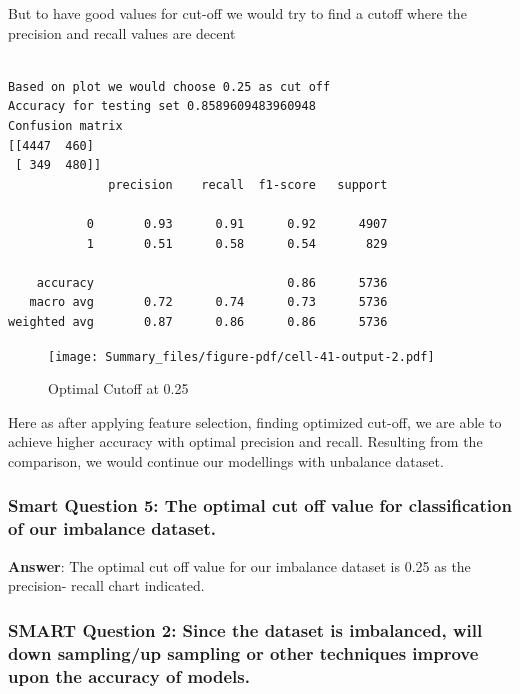 \documentclass[
  letterpaper,
  DIV=11,
  numbers=noendperiod]{scrartcl}
\begin{document}
But to have good values for cut-off we would try to find a cutoff where
the precision and recall values are decent

\begin{verbatim}

Based on plot we would choose 0.25 as cut off 
Accuracy for testing set 0.8589609483960948
Confusion matrix 
[[4447  460]
 [ 349  480]]
              precision    recall  f1-score   support

           0       0.93      0.91      0.92      4907
           1       0.51      0.58      0.54       829

    accuracy                           0.86      5736
   macro avg       0.72      0.74      0.73      5736
weighted avg       0.87      0.86      0.86      5736
\end{verbatim}

\begin{figure}

{\centering \texttt{[image: Summary\_files/figure-pdf/cell-41-output-2.pdf]}

}

\caption{Optimal Cutoff at 0.25}

\end{figure}

Here as after applying feature selection, finding optimized cut-off, we
are able to achieve higher accuracy with optimal precision and recall.
Resulting from the comparison, we would continue our modellings with
unbalance dataset.

\hypertarget{smart-question-5-the-optimal-cut-off-value-for-classification-of-our-imbalance-dataset.}{%
\subsubsection{Smart Question 5: The optimal cut off value for
classification of our imbalance
dataset.}\label{smart-question-5-the-optimal-cut-off-value-for-classification-of-our-imbalance-dataset.}}

\textbf{Answer}: The optimal cut off value for our imbalance dataset is
0.25 as the precision- recall chart indicated.

\hypertarget{smart-question-2-since-the-dataset-is-imbalanced-will-down-samplingup-sampling-or-other-techniques-improve-upon-the-accuracy-of-models.}{%
\subsubsection{SMART Question 2: Since the dataset is imbalanced, will
down sampling/up sampling or other techniques improve upon the accuracy
of
models.}\label{smart-question-2-since-the-dataset-is-imbalanced-will-down-samplingup-sampling-or-other-techniques-improve-upon-the-accuracy-of-models.}}
\end{document}
